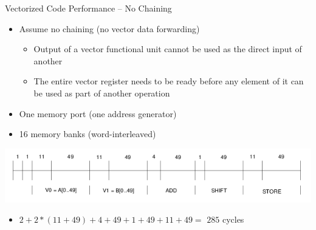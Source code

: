 \documentclass[presentation]{beamer}
\begin{document}
\begin{frame}[label={sec:org575ba1c}]{Vectorized Code Performance -- No Chaining}
\begin{block}{}
\begin{itemize}
\item Assume no chaining (no vector data forwarding)
\begin{itemize}
\item Output of a vector functional unit cannot be used as the direct input of another
\item The entire vector register needs to be ready before any element of it can be used as part of another operation
\end{itemize}
\item One memory port (one address generator)
\item 16 memory banks (word-interleaved)
\end{itemize}
\end{block}

\begin{block}{}
\begin{center}
\includegraphics[width=.9\linewidth]{./images/slides_SIMD_37_small.png}
\end{center}

\begin{itemize}
\item \(2+2*(11+49)+4+49+1+49+11+49 =\) \alert{\(285\)} cycles
\end{itemize}
\end{block}
\end{frame}
\end{document}
